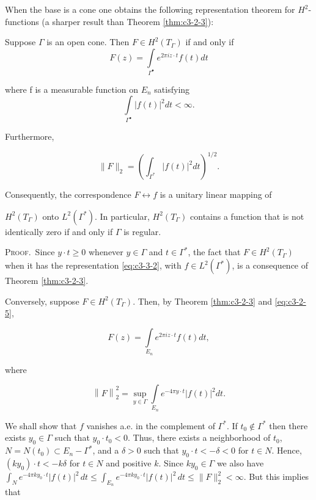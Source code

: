 When the base is a cone one obtains the following representation theorem for $H^{2}$-functions (a sharper result than Theorem \ref{thm:c3-2-3}):

\begin{theorem}
\label{thm:c3-3-1}
Suppose $\Gamma$ is an open cone. Then $F \in H^2(T_\Gamma)$ if and only if
\begin{equation}\label{eq:c3-3-2}
F(z)=\int\limits_{\Gamma^{\bullet}}e^{2\pi i z\cdot t}f(t)d t
\end{equation}

where f is a measurable function on $E_{n}$ satisfying
\[
\int\limits_{\Gamma^{\bullet}}|f(t)|^{2}d t<\infty.
\]

\end{theorem}

Furthermore,

\[
\|F\|_{2}=\left(\int_{\Gamma^{*}}|f(t)|^{2}d t\right)^{1/2}.
\]

Consequently, the correspondence $F \leftrightarrow f$ is a unitary linear mapping of

$H^2(T_\Gamma)$ onto $L^2(\Gamma^*)$. In particular, $H^2(T_\Gamma)$ contains a function that is not identically zero if and only if $\Gamma$ is regular.

\textsc{Proof.}\ Since $y \cdot t \geq 0$ whenever $y \in \Gamma$ and $t \in \Gamma^*$, the fact that $F \in H^2(T_\Gamma)$ when it has the representation \eqref{eq:c3-3-2}, with $f \in L^2(\Gamma^*)$, is a consequence of Theorem \eqref{thm:c3-2-3}.

Conversely, suppose $F \in H^2(T_\Gamma)$. Then, by Theorem \ref{thm:c3-2-3} and \eqref{eq:c3-2-5},

\[
F(z)=\int\limits_{E_{n}}e^{2\pi i z\cdot t}f(t)d t,
\]

where

\[
\left\|F\right\|_{2}^{2}=\sup_{y\in\Gamma}\int\limits_{E_{n}}e^{-4\pi y\cdot t}|f(t)|^{2}dt.
\]

We shall show that $f$ vanishes a.e. in the complement of $\Gamma^*$. If $t_0 \notin \Gamma^*$ then there exists $y_0 \in \Gamma$ such that $y_0 \cdot t_0 < 0$. Thus, there exists a neighborhood of $t_0$, $N = N(t_0) \subset E_n - \Gamma^*$, and a $\delta > 0$ such that $y_0 \cdot t < -\delta < 0$ for $t \in N$. Hence, $(ky_0) \cdot t < -k\delta$ for $t \in N$ and positive $k$. Since $ky_0 \in \Gamma$ we also have $\int_N e^{-4\pi k y_0 \cdot t} |f(t)|^2 \, dt \leq \int_{E_n} e^{-4\pi k y_0 \cdot t} |f(t)|^2 \, dt \leq \|F\|_2^2 < \infty$. But this implies that

